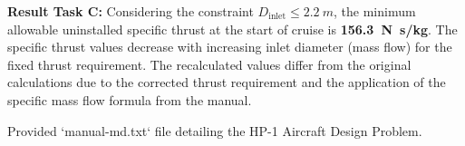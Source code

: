 \documentclass{article}
\begin{document}
\textbf{Result Task C:} Considering the constraint $D_{\text{inlet}} \le \SI{2.2}{m}$, the minimum allowable uninstalled specific thrust at the start of cruise is \textbf{\SI{156.3}{N.s/kg}}. The specific thrust values decrease with increasing inlet diameter (mass flow) for the fixed thrust requirement. The recalculated values differ from the original calculations due to the corrected thrust requirement and the application of the specific mass flow formula from the manual.

\begin{thebibliography}{9}
     Provided `manual-md.txt` file detailing the HP-1 Aircraft Design Problem.
\end{thebibliography}
\end{document}
